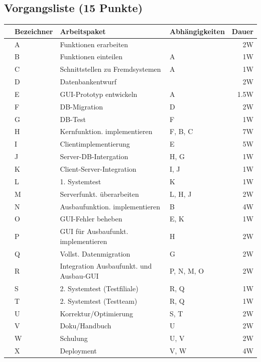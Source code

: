 \documentclass{scrartcl}
\begin{document}
\subsection{Vorgangsliste (15 Punkte)}
\begin{center}
   \renewcommand{\arraystretch}{1.5}
   \begin{tabular}{l:lllr}
      \toprule
      &Bezeichner & Arbeitspaket & Abhängigkeiten & Dauer\\
      \midrule
      &A & Funktionen erarbeiten & & 2W\\
      &B & Funktionen einteilen & A & 1W\\
      &C & Schnittstellen zu Fremdsystemen & A & 1W\\
      &D & Datenbankentwurf & & 2W \\
      &E & GUI-Prototyp entwickeln & A & 1.5W\\
      \midrule
      &F & DB-Migration & D & 2W \\
      &G & DB-Test & F& 1W \\
      &H & Kernfunktion. implementieren & F, B, C & 7W \\
      &I & Clientimplementierung & E & 5W \\
      &J & Server-DB-Intergation & H, G& 1W \\
      &K & Client-Server-Integration & I, J & 1W \\
      &L & 1. Systemtest & K & 1W \\
      \midrule
      &M & Serverfunkt. überarbeiten & L, H, J& 2W \\
      &N & Ausbaufunktion.  implementieren & B & 4W\\
      &O & GUI-Fehler beheben & E, K & 1W \\
      &P & GUI für Ausbaufunkt. implementieren & H & 2W \\
      &Q & Vollst. Datenmigration & G & 2W \\
      &R & Integration Ausbaufunkt.  und Ausbau-GUI & P, N, M, O & 2W \\
      &S & 2. Systemtest (Testfiliale) & R, Q & 1W \\
      &T & 2. Systemtest (Testteam) & R, Q & 1W \\
      \midrule
      &U & Korrektur/Optimierung & S, T & 2W \\
      &V & Doku/Handbuch & U & 2W \\
      &W & Schulung & U, V & 2W \\
      &X & Deployment &  V, W & 4W\\
      \bottomrule
   \end{tabular}
\end{center}
\end{document}
